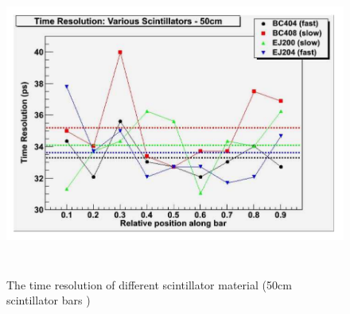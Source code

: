 \begin{figure}
\centerline{\includegraphics[width=13cm,height=10cm]{ye/fig_ye_scintillator/s0.pdf}}
\caption{The time resolution of different scintillator material (50cm scintillator bars )}
\label{f:TRmaterial}
\end{figure}

